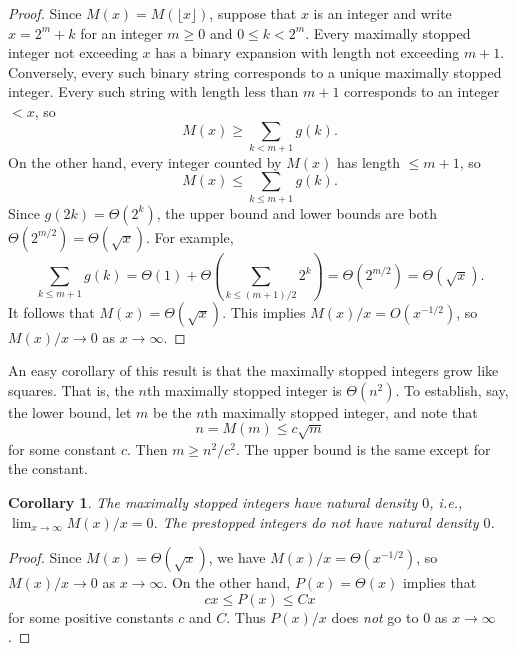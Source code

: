 \documentclass[12pt]{amsart}
\newtheorem{corollary}{Corollary}
\theoremstyle{definition}
\begin{document}
\begin{proof}
    Since $M(x) = M(\lfloor x \rfloor)$, suppose that $x$ is an integer and
    write $x = 2^m + k$ for an integer $m \geq 0$ and $0 \leq k < 2^m$. Every
    maximally stopped integer not exceeding $x$ has a binary expansion with
    length not exceeding $m + 1$. Conversely, every such binary string
    corresponds to a unique maximally stopped integer. Every such string with
    length less than $m + 1$ corresponds to an integer $< x$, so
    \begin{equation*}
        M(x) \geq \sum_{k < m + 1} g(k).
    \end{equation*}
    On the other hand, every integer counted by $M(x)$ has length $\leq m + 1$,
    so
    \begin{equation*}
        M(x) \leq \sum_{k \leq m + 1} g(k).
    \end{equation*}
    Since $g(2k) = \Theta(2^k)$, the upper bound and lower bounds are both
    $\Theta(2^{m / 2}) = \Theta(\sqrt{x})$. For example,
    \begin{equation*}
        \sum_{k \leq m + 1} g(k) = \Theta(1) + \Theta(\sum_{k \leq (m + 1) / 2} 2^k) = \Theta(2^{m / 2}) = \Theta(\sqrt{x}).
    \end{equation*}
    It follows that $M(x) = \Theta(\sqrt{x})$. This implies $M(x) / x =
    O(x^{-1/2})$, so $M(x) / x \to 0$ as $x \to \infty$.
\end{proof}

An easy corollary of this result is that the maximally stopped integers grow
like squares. That is, the $n$th maximally stopped integer is $\Theta(n^2)$. To
establish, say, the lower bound, let $m$ be the $n$th maximally stopped
integer, and note that
\begin{equation*}
    n = M(m) \leq c \sqrt{m}
\end{equation*}
for some constant $c$. Then $m \geq n^2 / c^2$. The upper bound is the same
except for the constant.

\begin{corollary}
    The maximally stopped integers have natural density $0$, i.e., $\lim_{x \to
    \infty} M(x) / x = 0$. The prestopped integers do not have natural density
    $0$.
\end{corollary}

\begin{proof}
    Since $M(x) = \Theta(\sqrt{x})$, we have $M(x) / x = \Theta(x^{-1/2})$, so
    $M(x) / x \to 0$ as $x \to \infty$. On the other hand, $P(x) = \Theta(x)$
    implies that
    \begin{equation*}
        cx \leq P(x) \leq Cx
    \end{equation*}
    for some positive constants $c$ and $C$. Thus $P(x) / x$ does \emph{not} go
    to $0$ as $x \to \infty$.
\end{proof}
\end{document}
